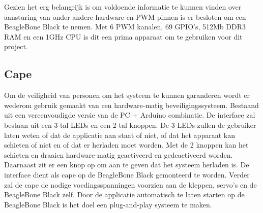 Gezien het erg belangrijk is om voldoende informatie te kunnen vinden over aansturing 
van onder andere hardware en PWM pinnen is er besloten om een BeagleBone Black te 
nemen. Met 6 PWM kanalen, 69 GPIO's, 512Mb DDR3 RAM en een 1GHz CPU is dit een prima 
apparaat om te gebruiken voor dit project.

\subsection{Cape}
\label{sub:cape}
Om de veiligheid van personen om het systeem te kunnen garanderen wordt er wederom 
gebruik gemaakt van een hardware-matig beveiligingssysteem. Bestaand uit een 
vereenvoudigde versie van de PC + Arduino combinatie.
De interface zal bestaan uit een 3-tal LEDs en een 2-tal knoppen. De 3 LEDs zullen 
de gebruiker laten weten of dat de applicatie aan staat of niet, of dat het apparaat 
kan schieten of niet en of dat er herladen moet worden.
Met de 2 knoppen kan het schieten en draaien hardware-matig geactiveerd en gedeactiveerd 
worden. Daarnaast zit er een knop op om aan te geven dat het systeem herladen is.
De interface dient als cape op de BeagleBone Black gemonteerd te worden. Verder zal de 
cape de nodige voedingsspanningen voorzien aan de kleppen, servo's en de BeagleBone Black 
zelf. Door de applicatie automatisch te laten starten op de BeagleBone Black is het doel 
een plug-and-play systeem te maken.